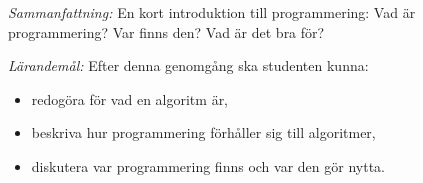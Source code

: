
\emph{Sammanfattning:}
En kort introduktion till programmering:
Vad är programmering?
Var finns den?
Vad är det bra för?

\emph{Lärandemål:}
Efter denna genomgång ska studenten kunna:
\begin{itemize}
  \item redogöra för vad en algoritm är,
  \item beskriva hur programmering förhåller sig till algoritmer,
  \item diskutera var programmering finns och var den gör nytta.
\end{itemize}
